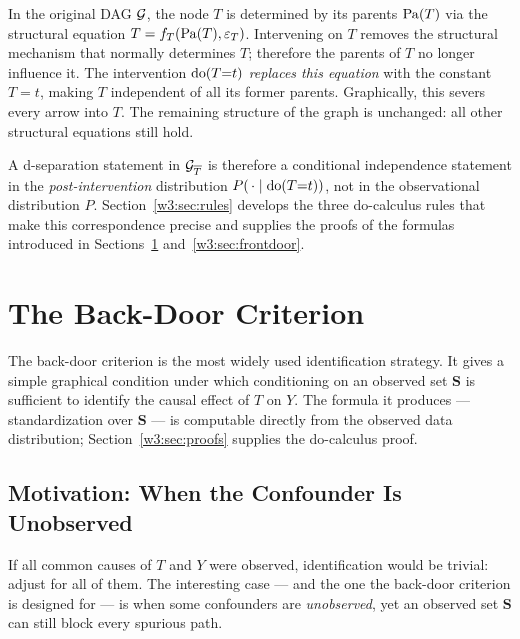 \documentclass[master.tex]{subfiles}
\begin{document}
\begin{tcolorbox}[defstyle, title={The Intervention Principle}]
In the original DAG $\mathcal{G}$, the node $T$ is determined by its parents
$\mathrm{Pa}(T)$ via the structural equation $T = f_T(\mathrm{Pa}(T), \varepsilon_T)$.
Intervening on $T$ removes the structural mechanism that normally determines
$T$; therefore the parents of $T$ no longer influence it.
The intervention $\mathrm{do}(T{=}t)$ \emph{replaces this equation} with the
constant $T = t$, making $T$ independent of all its former parents.
Graphically, this severs every arrow into $T$.  The remaining structure of
the graph is unchanged: all other structural equations still hold.

A d-separation statement in $\mathcal{G}_{\overline{T}}$ is therefore a
conditional independence statement in the \emph{post-intervention}
distribution $P(\,\cdot \mid \mathrm{do}(T{=}t))$, not in the observational
distribution $P$.  Section~\ref{w3:sec:rules} develops the three do-calculus
rules that make this correspondence precise and supplies the proofs of the
formulas introduced in Sections~\ref{w3:sec:backdoor}
and~\ref{w3:sec:frontdoor}.
\end{tcolorbox}

\section{The Back-Door Criterion}
\label{w3:sec:backdoor}

The back-door criterion is the most widely used identification strategy.
It gives a simple graphical condition under which conditioning on an
observed set $\mathbf{S}$ is sufficient to identify the causal effect of
$T$ on $Y$.  The formula it produces --- standardization over $\mathbf{S}$
--- is computable directly from the observed data distribution;
Section~\ref{w3:sec:proofs} supplies the do-calculus proof.

\subsection{Motivation: When the Confounder Is Unobserved}
\label{w3:sec:backdoor-motiv}

If all common causes of $T$ and $Y$ were observed, identification would be trivial: adjust
for all of them.  The interesting case --- and the one the back-door criterion is designed
for --- is when some confounders are \emph{unobserved}, yet an observed set $\mathbf{S}$
can still block every spurious path.
\end{document}
